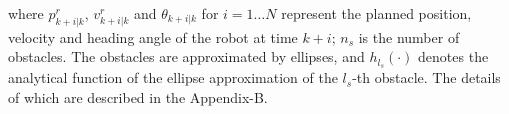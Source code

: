 \documentclass[journal]{IEEEtran}
\DeclareRobustCommand{\clnote}[1]{\ifthenelse{\boolean{include-notes}}%
{\textcolor{orange}{\textbf{CL: #1}}}{}}
\begin{document}
    where $p^r_{k+i|k}$, $v^r_{k+i|k}$ and $\theta_{k+i|k}$ for $i = 1 \dots N$ represent the planned position, velocity and heading angle of the robot at time $k+i$; %
    $n_s$ is the number of obstacles.
The obstacles are approximated by ellipses, and $h_{l_s}(\cdot)$ denotes the analytical function of the ellipse approximation of the $l_s$-th obstacle. The details of which are described in the Appendix-B.
    
\end{document}
